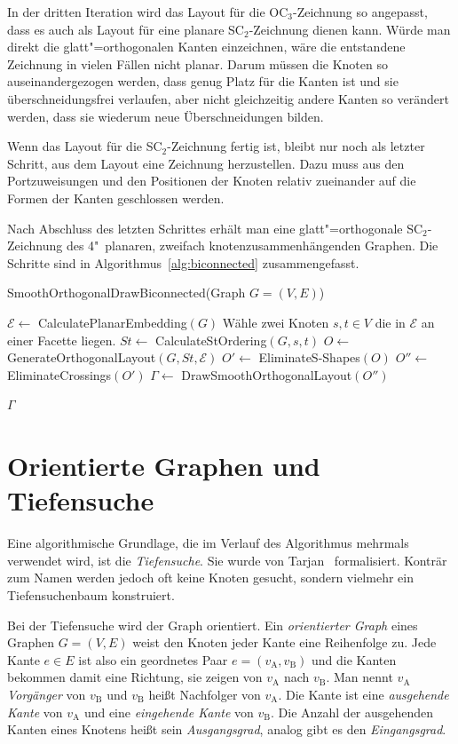 \documentclass[a4paper]{scrreprt}
\theoremstyle{definition}
\newcommand{\Epsilon}{\mathcal{E}}
\begin{document}
In der dritten Iteration wird das Layout für die OC$_3$-Zeichnung so angepasst, dass es auch als Layout für eine planare SC$_2$-Zeichnung dienen kann. Würde man direkt die glatt"=orthogonalen Kanten einzeichnen, wäre die entstandene Zeichnung in vielen Fällen nicht planar. Darum müssen die Knoten so auseinandergezogen werden, dass genug Platz für die Kanten ist und sie überschneidungsfrei verlaufen, aber nicht gleichzeitig andere Kanten so verändert werden, dass sie wiederum neue Überschneidungen bilden.

Wenn das Layout für die SC$_2$-Zeichnung fertig ist, bleibt nur noch als letzter Schritt, aus dem Layout eine Zeichnung herzustellen. Dazu muss aus den Portzuweisungen und den Positionen der Knoten relativ zueinander auf die Formen der Kanten geschlossen werden.

Nach Abschluss des letzten Schrittes erhält man eine glatt"=orthogonale SC$_2$-Zeichnung des 4"~planaren, zweifach knotenzusammenhängenden Graphen. Die Schritte sind in Algorithmus~\ref{alg:biconnected} zusammengefasst.

\begin{algorithm}[ht]
  \caption{SmoothOrthogonalDrawBiconnected(Graph $G = (V,E)$)}
  \label{alg:biconnected}
  
  $\Epsilon \leftarrow$ CalculatePlanarEmbedding$(G)$ \;
  Wähle zwei Knoten $s, t \in V$ die in $\Epsilon$ an einer Facette liegen.\;
  $St \leftarrow$ CalculateStOrdering$(G, s, t)$ \;
  $O \leftarrow$ GenerateOrthogonalLayout$(G,St,\Epsilon)$ \;
  $O' \leftarrow$ EliminateS-Shapes$(O)$ \;
  $O'' \leftarrow$ EliminateCrossings$(O')$ \;
  $\Gamma \leftarrow$ DrawSmoothOrthogonalLayout$(O'')$ \;
  
  \Return $\Gamma$
\end{algorithm}

\section{Orientierte Graphen und Tiefensuche}

Eine algorithmische Grundlage, die im Verlauf des Algorithmus mehrmals verwendet wird, ist die \emph{Tiefensuche}. Sie wurde von Tarjan~\cite{tarjan-72} formalisiert. Konträr zum Namen werden jedoch oft keine Knoten gesucht, sondern vielmehr ein Tiefensuchenbaum konstruiert.

Bei der Tiefensuche wird der Graph orientiert. Ein \emph{orientierter Graph} eines Graphen $G = (V, E)$ weist den Knoten jeder Kante eine Reihenfolge zu. Jede Kante $e \in E$ ist also ein geordnetes Paar $e = (v_\text{A}, v_\text{B})$ und die Kanten bekommen damit eine Richtung, sie zeigen von $v_\text{A}$ nach $v_\text{B}$. Man nennt $v_\text{A}$ \emph{Vorgänger} von $v_\text{B}$ und $v_\text{B}$ heißt Nachfolger von $v_\text{A}$. Die Kante ist eine \emph{ausgehende Kante} von $v_\text{A}$ und eine \emph{eingehende Kante} von $v_\text{B}$. Die Anzahl der ausgehenden Kanten eines Knotens heißt sein \emph{Ausgangsgrad}, analog gibt es den \emph{Eingangsgrad}.
\end{document}
